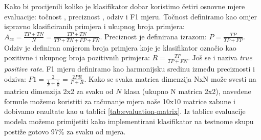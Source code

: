 \documentclass[times, utf8, diplomski]{fer}
\theoremstyle{definition}
\begin{document}
Kako bi procijenili koliko je klasifikator dobar koristimo četiri osnovne mjere evaluacije: točnost , preciznost , odziv  i F1 mjeru.
\newline
Točnost definiramo kao omjer ispravno klasificiranih primjera i ukupnog broja primjera:
$A_{cc} = \frac{TP + TN}{N} = \frac{TP + TN}{TP + TN + FP + FN}$.
\newline
Preciznost je definirana izrazom: $P = \frac{TP}{TP + FP}$.
\newline
Odziv je definiran omjerom broja primjera koje je klasifikator označio kao pozitivne i ukupnog broja pozitivnih primjera:
$R = \frac{TP}{TP + FN}$. Još se i naziva \textit{true positive rate}.
\newline
F1 mjeru definiramo kao harmonijsku sredinu između preciznosti i odziva:
$F1 = \frac{2}{\frac{1}{P} + \frac{1}{R}} = \frac{2PR}{P + R}$. Kako se svaka matrica dimenzija NxN može svesti na matricu dimenzija 2x2 za svaku od $N$ klasa (ukupno N matrica 2x2), navedene formule možemo koristiti za računanje mjera naše 10x10 matrice zabune i dobivamo rezultate kao u tablici \ref{tab:evaluation-matrix}.
\newline
Iz tablice evaluacije modela možemo primijetiti kako implementirani klasifikator na testnome skupu postiže gotovo 97\% za svaku od mjera.
\end{document}
